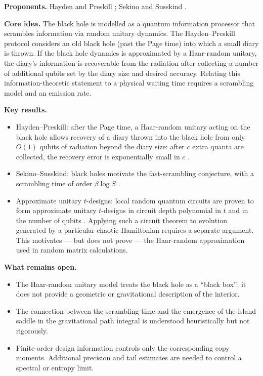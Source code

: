 \documentclass[11pt,letterpaper]{article}
\theoremstyle{plain}
\theoremstyle{definition}
\theoremstyle{remark}
\begin{document}
\textbf{Proponents.}  Hayden and Preskill \cite{haydenpreskill2007}; Sekino
and Susskind \cite{sekinosusskind2008}.

\medskip
\noindent
\textbf{Core idea.}  The black hole is modelled as a quantum information
processor that scrambles information via random unitary dynamics.  The Hayden--Preskill
protocol considers an old black hole (past the Page time) into which a small
diary is thrown.  If the black hole dynamics is approximated by a Haar-random
unitary, the diary's information is recoverable from the radiation after
collecting a number of additional qubits set by the diary size and desired
accuracy.  Relating this information-theoretic statement to a physical waiting
time requires a scrambling model and an emission rate.

\medskip
\noindent
\textbf{Key results.}
\begin{itemize}
  \item Hayden--Preskill: after the Page time, a Haar-random unitary acting
    on the black hole allows recovery of a diary thrown into the black hole
    from only $O(1)$ qubits of radiation beyond the diary size: after $c$
    extra quanta are collected, the recovery error is exponentially small in $c$
    \cite{haydenpreskill2007}.
  \item Sekino--Susskind: black holes motivate the fast-scrambling conjecture,
    with a scrambling time of order $\beta\log S$ \cite{sekinosusskind2008}.
  \item Approximate unitary $t$-designs: local random quantum circuits are
    proven to form approximate unitary $t$-designs in circuit depth
    polynomial in $t$ and in the number of qubits \citep{brandaoetal2016}.
    Applying such a circuit theorem to evolution generated by a particular
    chaotic Hamiltonian requires a separate argument.  This motivates --- but does not
    prove --- the Haar-random approximation used in random matrix
    calculations.
\end{itemize}

\medskip
\noindent
\textbf{What remains open.}
\begin{itemize}
  \item The Haar-random unitary model treats the black hole as a ``black box'';
    it does not provide a geometric or gravitational description of the interior.
  \item The connection between the scrambling time and the emergence of the
    island saddle in the gravitational path integral is understood heuristically
    but not rigorously.
  \item Finite-order design information controls only the corresponding copy
    moments. Additional precision and tail estimates are needed to control
    a spectral or entropy limit.
\end{itemize}
\end{document}
